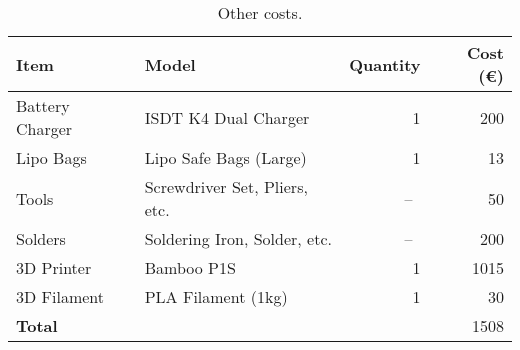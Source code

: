 \begin{table}[H]
    \begin{tabular}{ l l r r }
        \toprule
        \textbf{Item} & \textbf{Model} & \textbf{Quantity} & \textbf{Cost (\euro)} \\
        \midrule
        Battery Charger & ISDT K4 Dual Charger \autocite{rcinnovationsISDTCargador} & 1 & 200 \\
        Lipo Bags & Lipo Safe Bags (Large) \autocite{rcinnovationsBolsaProtectora} & 1 & 13 \\
        Tools & Screwdriver Set, Pliers, etc. &~--~& 50 \\
        Solders & Soldering Iron, Solder, etc. &~--~& 200 \\
        3D Printer & Bamboo P1S \autocite{bambulabBambuPrinter} & 1 & 1015 \\
        3D Filament & PLA Filament (1kg) & 1 & 30 \\
        \midrule
        \textbf{Total} & & & 1508 \\
        \bottomrule
    \end{tabular}
    \caption{Other costs.}\label{tab:other_costs}
\end{table}
